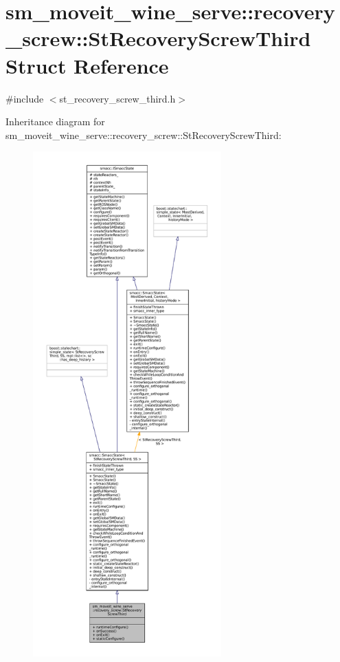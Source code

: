 \hypertarget{structsm__moveit__wine__serve_1_1recovery__screw_1_1StRecoveryScrewThird}{}\section{sm\+\_\+moveit\+\_\+wine\+\_\+serve\+:\+:recovery\+\_\+screw\+:\+:St\+Recovery\+Screw\+Third Struct Reference}
\label{structsm__moveit__wine__serve_1_1recovery__screw_1_1StRecoveryScrewThird}


{\ttfamily \#include $<$st\+\_\+recovery\+\_\+screw\+\_\+third.\+h$>$}



Inheritance diagram for sm\+\_\+moveit\+\_\+wine\+\_\+serve\+:\+:recovery\+\_\+screw\+:\+:St\+Recovery\+Screw\+Third\+:
\nopagebreak
\begin{figure}[H]
\begin{center}
\leavevmode
\includegraphics[height=550pt]{structsm__moveit__wine__serve_1_1recovery__screw_1_1StRecoveryScrewThird__inherit__graph}
\end{center}
\end{figure}


